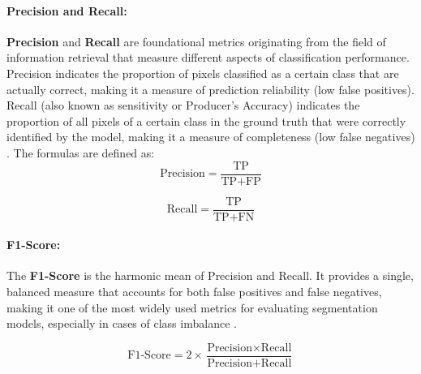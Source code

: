 \documentclass{report}
\begin{document}
\paragraph{Precision and Recall:} \textbf{Precision} and \textbf{Recall} are foundational metrics originating from the field of information retrieval that measure different aspects of classification performance. Precision indicates the proportion of pixels classified as a certain class that are actually correct, making it a measure of prediction reliability (low false positives). Recall (also known as sensitivity or Producer's Accuracy) indicates the proportion of all pixels of a certain class in the ground truth that were correctly identified by the model, making it a measure of completeness (low false negatives) \parencites[p.~7]{KaiserEtAlLearningAerialImageSegmentationOnlineMaps2017}[p.~342]{CostaEtAlSupervisedmethodsimagesegmentationaccuracyassessmentlandcovermapping2018}.
The formulas are defined as:
\begin{equation}
\text{Precision} = \frac{\text{TP}}{\text{TP} + \text{FP}}
\label{eq:precision}
\end{equation}

\begin{equation}
\text{Recall} = \frac{\text{TP}}{\text{TP} + \text{FN}}
\label{eq:recall}
\end{equation}


\paragraph{F1-Score:}
The \textbf{F1-Score} is the harmonic mean of Precision and Recall. It provides a single, balanced measure that accounts for both false positives and false negatives, making it one of the most widely used metrics for evaluating segmentation models, especially in cases of class imbalance \parencites[p.~9]{SertelEtAlLandUseLandCoverMappingUsingDeepLearningBasedSegmentationApproachesVHRWorldview3Images2022}[p.~7;]{KaiserEtAlLearningAerialImageSegmentationOnlineMaps2017}[p.~149;]{LeiEtAlDeeplearningimplementationimagesegmentationagriculturalapplicationscomprehensivereview2024}[p.~435]{ZhongEtAlDeeplearningbasedmultitemporalcropclassification2019}.

\begin{equation}
\text{F1-Score} = 2 \times \frac{\text{Precision} \times \text{Recall}}{\text{Precision} + \text{Recall}}
\label{eq:F1}
\end{equation}
\end{document}
